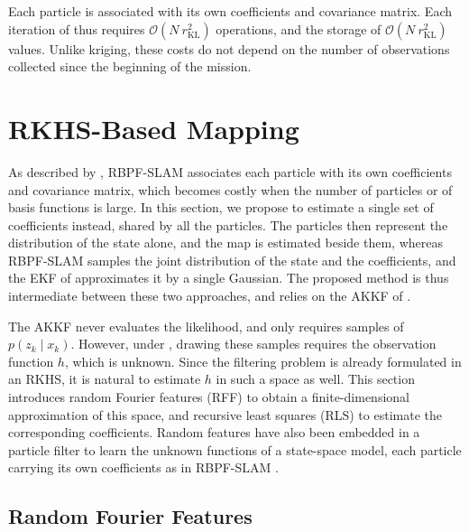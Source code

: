 \begin{remark}\label{th:SLAM_cost}
	Each particle is associated with its own coefficients and covariance matrix. Each iteration of  thus requires $\mathcal{O}\left(N\:r_{\mathrm{KL}}^2\right)$ operations, and the storage of $\mathcal{O}\left(N\:r_{\mathrm{KL}}^2\right)$ values. Unlike kriging, these costs do not depend on the number of observations collected since the beginning of the mission.
\end{remark}

\section{RKHS-Based Mapping}\label{sec:RKHS_SLAM}

As described by , RBPF-SLAM associates each particle with its own coefficients and covariance matrix, which becomes costly when the number of particles or of basis functions is large. In this section, we propose to estimate a single set of coefficients instead, shared by all the particles. The particles then represent the distribution of the state alone, and the map is estimated beside them, whereas RBPF-SLAM samples the joint distribution of the state and the coefficients, and the EKF of \cite{bib:magnetic-SLAM-EKF} approximates it by a single Gaussian. The proposed method is thus intermediate between these two approaches, and relies on the AKKF of .

The AKKF never evaluates the likelihood, and only requires samples of $p(z_k\mid x_k)$. However, under , drawing these samples requires the observation function $h$, which is unknown. Since the filtering problem is already formulated in an RKHS, it is natural to estimate $h$ in such a space as well. This section introduces random Fourier features (RFF) \cite{bib:RFF,bib:RFF-survey} to obtain a finite-dimensional approximation of this space, and recursive least squares (RLS) \cite{bib:RFF-RLS} to estimate the corresponding coefficients. Random features have also been embedded in a particle filter to learn the unknown functions of a state-space model, each particle carrying its own coefficients as in RBPF-SLAM \cite{bib:RFF-state-space}.

\subsection{Random Fourier Features}

